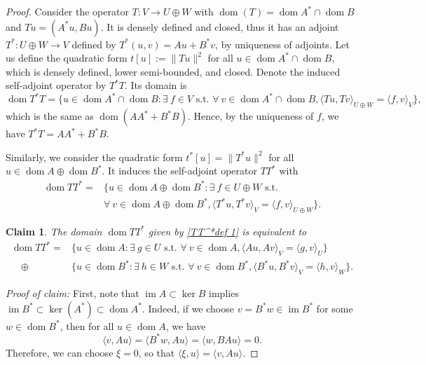 \documentclass[11pt]{article}
\newtheorem{claim}{Claim}[theorem]
\theoremstyle{definition}
\theoremstyle{remark}
\DeclareMathOperator\dom{dom}
\DeclareMathOperator{\im}{im}
\begin{document}
\begin{proof}
Consider the operator $T:V\to U\oplus W$ with $\dom(T)=\dom A^*\cap\dom B$ and $Tu=(A^*u,Bu)$. It is densely defined and closed, thus it has an adjoint $T^*:U\oplus W\to V$ defined by $T^*(u,v)=Au+B^*v$, by uniqueness of adjoints.
Let us define the quadratic form $t[u]:=\|Tu\|^2$ for all $u\in \dom A^*\cap\dom B$, which is densely defined, lower semi-bounded, and closed. Denote the induced self-adjoint operator by $T^*T$. Its domain is
$$
    \dom T^*T=\{u\in \dom A^*\cap\dom B:\exists\ f\in V \text{ s.t. }
    \forall\ v\in \dom A^*\cap\dom B, \langle Tu,Tv\rangle_{U\oplus W}=\langle f,v\rangle_{V}\},
$$
which is the same as $\dom (AA^*+B^*B)$. Hence, by the uniqueness of $f$, we have $T^*T=AA^*+B^*B$.

Similarly, we consider the quadratic form $t^*[u]=\|T^*u\|^2$ for all $u\in \dom A\oplus \dom B^*$. It induces the self-adjoint operator $TT^*$ with
\begin{align}\label{TT^*def 1}
    \dom TT^*=&\{u\in \dom A\oplus \dom B^*:\exists\ f\in U\oplus W
    \text{ s.t. }\\&\nonumber\forall\ v\in \dom A\oplus \dom B^*, \langle T^*u,T^*v\rangle_{V}=\langle f,v\rangle_{U\oplus W}\}.
\end{align}

\begin{claim}\label{cl:equivalence of domain}
    The domain $\dom TT^*$ given by \cref{TT^*def 1} is equivalent to
\begin{align}\label{TT^*def 2}
    \dom TT^*=&\{u\in \dom A:\exists\ g\in U \text{ s.t. }\forall\ v\in \dom A,\langle Au,Av\rangle_V=\langle g,v\rangle_U\}\nonumber\\
    \quad\oplus&\{u\in \dom B^*:\exists\ h\in W \text{ s.t. }\forall\ v\in \dom B^*,\langle B^*u,B^*v\rangle_V=\langle h,v\rangle_W\}.
\end{align}
\end{claim} 
\noindent
\textit{Proof of claim:} First, note that $\im A\subset \ker B$ implies $\im B^*\subset \ker(A^*) \subset \dom A^*$. Indeed, if we choose $v=B^*w\in \im B^*$ for some $w\in \dom B^*$, then for all $u\in \dom A$, we have 
$$
\langle v,Au \rangle =\langle B^*w,Au \rangle =\langle w,BAu \rangle=0.
$$
Therefore, we can choose $\xi=0$, so that $\langle \xi,u \rangle =\langle v,Au \rangle$.


\end{proof}
\end{document}
